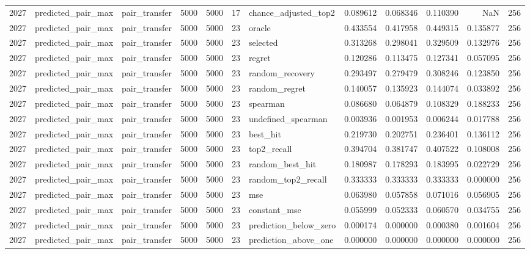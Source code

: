 \begin{tabular}{rllrrrlrrrrr}
2027 & predicted_pair_max & pair_transfer & 5000 & 5000 & 17 & chance_adjusted_top2 & 0.089612 & 0.068346 & 0.110390 & NaN & 256 \\
2027 & predicted_pair_max & pair_transfer & 5000 & 5000 & 23 & oracle & 0.433554 & 0.417958 & 0.449315 & 0.135877 & 256 \\
2027 & predicted_pair_max & pair_transfer & 5000 & 5000 & 23 & selected & 0.313268 & 0.298041 & 0.329509 & 0.132976 & 256 \\
2027 & predicted_pair_max & pair_transfer & 5000 & 5000 & 23 & regret & 0.120286 & 0.113475 & 0.127341 & 0.057095 & 256 \\
2027 & predicted_pair_max & pair_transfer & 5000 & 5000 & 23 & random_recovery & 0.293497 & 0.279479 & 0.308246 & 0.123850 & 256 \\
2027 & predicted_pair_max & pair_transfer & 5000 & 5000 & 23 & random_regret & 0.140057 & 0.135923 & 0.144074 & 0.033892 & 256 \\
2027 & predicted_pair_max & pair_transfer & 5000 & 5000 & 23 & spearman & 0.086680 & 0.064879 & 0.108329 & 0.188233 & 256 \\
2027 & predicted_pair_max & pair_transfer & 5000 & 5000 & 23 & undefined_spearman & 0.003936 & 0.001953 & 0.006244 & 0.017788 & 256 \\
2027 & predicted_pair_max & pair_transfer & 5000 & 5000 & 23 & best_hit & 0.219730 & 0.202751 & 0.236401 & 0.136112 & 256 \\
2027 & predicted_pair_max & pair_transfer & 5000 & 5000 & 23 & top2_recall & 0.394704 & 0.381747 & 0.407522 & 0.108008 & 256 \\
2027 & predicted_pair_max & pair_transfer & 5000 & 5000 & 23 & random_best_hit & 0.180987 & 0.178293 & 0.183995 & 0.022729 & 256 \\
2027 & predicted_pair_max & pair_transfer & 5000 & 5000 & 23 & random_top2_recall & 0.333333 & 0.333333 & 0.333333 & 0.000000 & 256 \\
2027 & predicted_pair_max & pair_transfer & 5000 & 5000 & 23 & mse & 0.063980 & 0.057858 & 0.071016 & 0.056905 & 256 \\
2027 & predicted_pair_max & pair_transfer & 5000 & 5000 & 23 & constant_mse & 0.055999 & 0.052333 & 0.060570 & 0.034755 & 256 \\
2027 & predicted_pair_max & pair_transfer & 5000 & 5000 & 23 & prediction_below_zero & 0.000174 & 0.000000 & 0.000380 & 0.001604 & 256 \\
2027 & predicted_pair_max & pair_transfer & 5000 & 5000 & 23 & prediction_above_one & 0.000000 & 0.000000 & 0.000000 & 0.000000 & 256 \\

\end{tabular}
